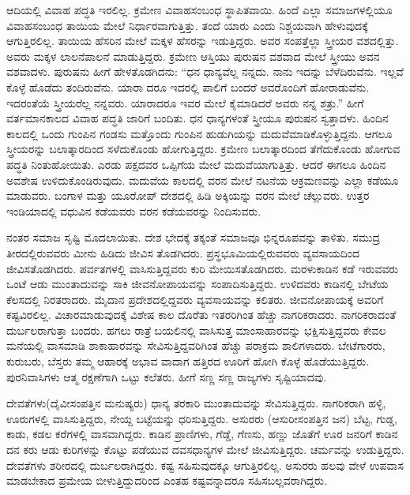 ಆದಿಯಲ್ಲಿ ವಿವಾಹ ಪದ್ಧತಿ ಇರಲಿಲ್ಲ. ಕ್ರಮೇಣ ವಿವಾಹಸಂಬಂಧ ಸ್ಥಾಪಿತವಾಯಿ. ಹಿಂದೆ ಎಲ್ಲಾ ಸಮಾಜಗಳಲ್ಲಿಯೂ ವಿವಾಹಸಂಬಂಧ ತಾಯಿಯ ಮೇಲೆ ನಿರ್ಧಾರವಾಗುತ್ತಿತ್ತು. ತಂದೆ ಯಾರು ಎಂದು ನಿಶ್ಚಯವಾಗಿ ಹೇಳುವುದಕ್ಕೆ ಆಗುತ್ತಿರಲಿಲ್ಲ. ತಾಯಿಯ ಹೆಸರಿನ ಮೇಲೆ ಮಕ್ಕಳ ಹೆಸರನ್ನು ಇಡುತ್ತಿದ್ದರು. ಅವರ ಸಂಪತ್ತೆಲ್ಲಾ ಸ್ತ್ರೀಯರ ವಶದಲ್ಲಿತ್ತು. ಅವರು ಮಕ್ಕಳ ಲಾಲನೆಪಾಲನೆ ಮಾಡುತ್ತಿದ್ದರು. ಕ್ರಮೇಣ ಆಸ್ತಿಯು ಪುರುಷನ ವಶವಾದ ಮೇಲೆ ಸ್ತ್ರೀಯು ಅವನ ವಶವಾದಳು. ಪುರುಷನು ಹೀಗೆ ಹೇಳತೊಡಗಿದನು: “ಧನ ಧಾನ್ಯವೆಲ್ಲ ನನ್ನದು. ನಾನು ಇದನ್ನು ಬೆಳೆದಿರುವೆನು. ಇಲ್ಲವೆ ಕೊಳ್ಳೆ ಹೊಡೆದು ತಂದಿರುವೆನು. ಯಾರಾ ದರೂ ಇದರಲ್ಲಿ ಪಾಲಿಗೆ ಬಂದರೆ ಅವರೊಂದಿಗೆ ಹೋರಾಡುವೆನು. ಇದರಂತೆಯೆ ಸ್ತ್ರೀಯರೆಲ್ಲ ನನ್ನವರು. ಯಾರಾದರೂ ಇವರ ಮೇಲೆ ಕೈಮಾಡಿದರೆ ಅವರು ನನ್ನ ಶತ್ರು.” ಹೀಗೆ ವರ್ತಮಾನಕಾಲದ ವಿವಾಹ ಪದ್ಧತಿ ಜಾರಿಗೆ ಬಂದಿತು. ಧನ ಧಾನ್ಯಗಳಂತೆ ಸ್ತ್ರೀಯೂ ಪುರುಷನ ಸ್ವತ್ತಾದಳು. ಹಿಂದಿನ ಕಾಲದಲ್ಲಿ ಒಂದು ಗುಂಪಿನ ಗಂಡಸು ಮತ್ತೊಂದು ಗುಂಪಿನ ಹುಡುಗಿಯನ್ನು ಮದುವೆಮಾಡಿಕೊಳ್ಳುತ್ತಿದ್ದನು. ಆಗಲೂ ಸ್ತ್ರೀಯರನ್ನು ಬಲಾತ್ಕಾರದಿಂದ ಸಳೆದುಕೊಂಡು ಹೋಗುತ್ತಿದ್ದರು. ಕ್ರಮೇಣ ಬಲಾತ್ಕಾರದಿಂದ ತೆಗೆದುಕೊಂಡು ಹೋಗುವ ಪದ್ಧತಿ ನಿಂತುಹೋಯಿತು. ಎರಡು ಪಕ್ಷದವರ ಒಪ್ಪಿಗೆಯ ಮೇಲೆ ಮದುವೆಯಾಗುತ್ತಿತ್ತು. ಆದರೆ ಈಗಲೂ ಹಿಂದಿನ ಅವಶೇಷ ಉಳಿದುಕೊಂಡಿರುವುದು. ಮದುವೆಯ ಕಾಲದಲ್ಲಿ ವರನ ಮೇಲೆ ನಟನೆಯ ಆಕ್ರಮಣವನ್ನು ಎಲ್ಲಾ ಕಡೆಯೂ ಮಾಡುವರು. ಬಂಗಾಳ ಮತ್ತು ಯೂರೋಪ್​ ದೇಶದಲ್ಲಿ ಹಿಡಿ ಅಕ್ಕಿಯನ್ನು ವರನ ಮೇಲೆ ಚೆಲ್ಲುವರು. ಉತ್ತರ ಇಂಡಿಯಾದಲ್ಲಿ ವಧುವಿನ ಕಡೆಯವರು ವರನ ಕಡೆಯವರನ್ನು ನಿಂದಿಸುವರು.

ನಂತರ ಸಮಾಜ ಸೃಷ್ಟಿ ಮೊದಲಾಯಿತು. ದೇಶ ಭೇದಕ್ಕೆ ತಕ್ಕಂತೆ ಸಮಾಜವೂ ಭಿನ್ನರೂಪವನ್ನು ತಾಳಿತು. ಸಮುದ್ರ ತೀರದಲ್ಲಿರುವವರು ಮೀನು ಹಿಡಿದು ಜೀವಿಸ ತೊಡಗಿದರು. ಪ್ರಸ್ಥಭೂಮಿಯಲ್ಲಿರುವವರು ವ್ಯವಸಾಯದಿಂದ ಜೀವಿಸತೊಡಗಿದರು. ಪರ್ವತಗಳಲ್ಲಿ ವಾಸಿಸುತ್ತಿದ್ದವರು ಕುರಿ ಮೇಯಿಸತೊಡಗಿದರು. ಮರಳುಕಾಡಿನ ಕಡೆ ಇರುವವರು ಒಂಟೆ ಆಡು ಮುಂತಾದುವನ್ನು ಸಾಕಿ ಜೀವನೋಪಾಯವನ್ನು ಸಂಪಾದಿಸುತ್ತಿದ್ದರು. ಉಳಿದವರು ಕಾಡಿನಲ್ಲಿ ಬೇಟೆಯ ಕೆಲಸದಲ್ಲಿ ನಿರತರಾದರು. ಮೈದಾನ ಪ್ರದೇಶದಲ್ಲಿದ್ದವರು ವ್ಯವಸಾಯವನ್ನು ಕಲಿತರು. ಜೀವನೋಪಾಯಕ್ಕೆ ಅವರಿಗೆ ಕಷ್ಟವಿರಲಿಲ್ಲ. ವಿಚಾರಮಾಡುವುದಕ್ಕೆ ವಿಶೇಷ ಕಾಲ ದೊರೆತು ಇತರರಿಗಿಂತ ಹೆಚ್ಚು ನಾಗರಿಕರಾದರು. ನಾಗರಿಕರಾದಂತೆ ದುರ್ಬಲರಾಗುತ್ತಾ ಬಂದರು. ಹಗಲು ರಾತ್ರೆ ಬಯಲಿನಲ್ಲಿ ವಾಸಿಸುತ್ತ ಮಾಂಸಾಹಾರವನ್ನು ಭಕ್ಷಿಸುತ್ತಿದ್ದವರು ಕೇವಲ ಮನೆಯಲ್ಲಿ ವಾಸಮಾಡಿ ಶಾಕಾಹಾರವನ್ನು ಸೇವಿಸುತ್ತಿದ್ದವರಿಗಿಂತ ಹೆಚ್ಚು ಪರಾಕ್ರಮ ಶಾಲಿಗಳಾದರು. ಬೇಟೆಗಾರರು, ಕುರುಬರು, ಬೆಸ್ತರು ತಮ್ಮ ಆಹಾರಕ್ಕೆ ಅಭಾವ ವಾದಾಗ ಹತ್ತಿರದ ಊರಿಗೆ ಹೋಗಿ ಕೊಳ್ಳೆ ಹೊಡೆಯುತ್ತಿದ್ದರು. ಪುರನಿವಾಸಿಗಳು ಆತ್ಮ ರಕ್ಷಣೆಗಾಗಿ ಒಟ್ಟು ಕಲೆತರು. ಹೀಗೆ ಸಣ್ಣ ಸಣ್ಣ ರಾಜ್ಯಗಳು ಸೃಷ್ಟಿಯಾದವು.

ದೇವತೆಗಳು(ದೈವೀಸಂಪತ್ತಿನ ಮನುಷ್ಯರು) ಧಾನ್ಯ ತರಕಾರಿ ಮುಂತಾದುವನ್ನು ಸೇವಿಸುತ್ತಿದ್ದರು. ನಾಗರಿಕರಾಗಿ ಹಳ್ಳಿ, ಊರುಗಳಲ್ಲಿ ವಾಸಿಸುತ್ತಿದ್ದರು, ನೇಯ್ದ ಬಟ್ಟೆಯನ್ನು ಧರಿಸುತ್ತಿದ್ದರು. ಅಸುರರು (ಆಸುರೀಸಂಪತ್ತಿನ ಜನ) ಬೆಟ್ಟ, ಗುಡ್ಡ, ಕಾಡು, ಕಡಲ ಕರೆಗಳಲ್ಲಿ ವಾಸವಾಗಿದ್ದರು. ಕಾಡಿನ ಪ್ರಾಣಿಗಳು, ಗೆಡ್ಡೆ, ಗೆಣಸು, ಹಣ್ಣು ಜೊತೆಗೆ ಊರ ಜನರಿಗೆ ಕಾಡಿನ ದನ ಕರು ಆಡು ಕುರಿಗಳನ್ನು ಕೊಟ್ಟು ಪಡೆಯುವ ದವಸಧಾನ್ಯಗಳ ಮೇಲೆ ಜೀವಿಸುತ್ತಿದ್ದರು. ಚರ್ಮವನ್ನು ಉಡುತ್ತಿದ್ದರು. ದೇವತೆಗಳು ಶರೀರದಲ್ಲಿ ದುರ್ಬಲರಾಗಿದ್ದರು. ಕಷ್ಟ ಸಹಿಸುವುದಕ್ಕೂ ಆಗುತ್ತಿರಲಿಲ್ಲ. ಅಸುರರು ಹಲವು ವೇಳೆ ಉಪವಾಸ ಮಾಡಬೇಕಾದ ಪ್ರಮೇಯ ಬೀಳುತ್ತಿದ್ದುದರಿಂದ ಎಂತಹ ಕಷ್ಟವನ್ನಾದರೂ ಸಹಿಸಬಲ್ಲವರಾಗಿದ್ದರು.

